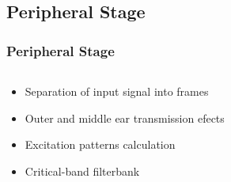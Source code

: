 \documentclass{beamer}
\begin{document}
\subsection{Peripheral Stage}
\begin{frame}
  \frametitle{Peripheral Stage}
  \begin{columns}
    \begin{column}{0.5\textwidth}
      \begin{itemize}
        \item<1-> Separation of input signal into frames
        \item<2-> Outer and middle ear transmission efects
        \item<3-> Excitation patterns calculation
        \item<4-> Critical-band filterbank
      \end{itemize}
    \end{column}
    \begin{column}{0.5\textwidth}
    \end{column}
  \end{columns}
\end{frame}
\end{document}
